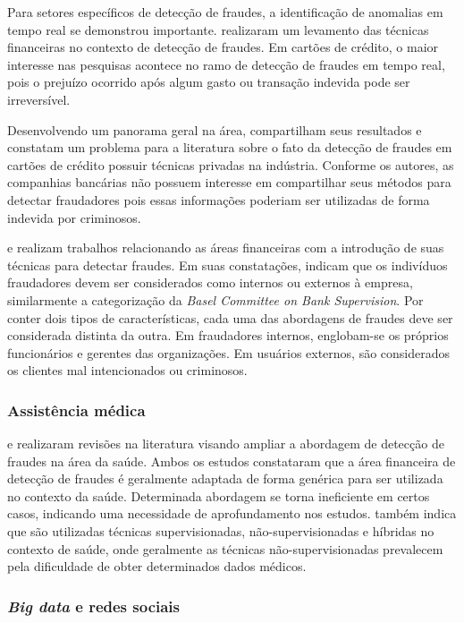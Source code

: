 \documentclass[smallextended]{svjour3}
\begin{document}
Para setores específicos de detecção de fraudes, a identificação de anomalias em tempo real se demonstrou importante. \cite{Edge2009} realizaram um levamento das técnicas financeiras no contexto de detecção de fraudes. Em cartões de crédito, o maior interesse nas pesquisas acontece no ramo de detecção de fraudes em tempo real, pois o prejuízo ocorrido após algum gasto ou transação indevida pode ser irreversível.

Desenvolvendo um panorama geral na área, \cite{Allan2010} compartilham seus resultados e constatam um problema para a literatura sobre o fato da detecção de fraudes em cartões de crédito possuir técnicas privadas na indústria. Conforme os autores, as companhias bancárias não possuem interesse em compartilhar seus métodos para detectar fraudadores pois essas informações poderiam ser utilizadas de forma indevida por criminosos.

\cite{Perlich2007} e \cite{Kanapickiene2015} realizam trabalhos relacionando as áreas financeiras com a introdução de suas técnicas para detectar fraudes. Em suas constatações, indicam que os indivíduos fraudadores devem ser considerados como internos ou externos à empresa, similarmente a categorização da \emph{Basel Committee on Bank Supervision}. Por conter dois tipos de características, cada uma das abordagens de fraudes deve ser considerada distinta da outra. Em fraudadores internos, englobam-se os próprios funcionários e gerentes das organizações. Em usuários externos, são considerados os clientes mal intencionados ou criminosos.  

\subsubsection{Assistência médica}

\cite{Bauder2016} e \cite{Li2008} realizaram revisões na literatura visando ampliar a abordagem de detecção de fraudes na área da saúde. Ambos os estudos constataram que a área financeira de detecção de fraudes é geralmente adaptada de forma genérica para ser utilizada no contexto da saúde. Determinada abordagem se torna ineficiente em certos casos, indicando uma necessidade de aprofundamento nos estudos. \cite{} também indica que são utilizadas técnicas supervisionadas, não-supervisionadas e híbridas no contexto de saúde, onde geralmente as técnicas não-supervisionadas prevalecem pela dificuldade de obter determinados dados médicos.

\subsubsection{\emph{Big data} e redes sociais}
\end{document}
